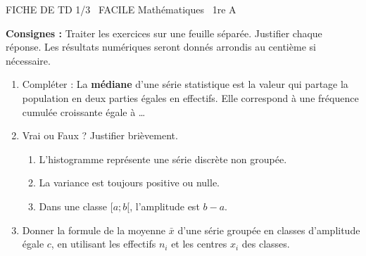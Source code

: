 \documentclass[11pt]{article}
\begin{document}
\begin{tcolorbox}[enhanced,colback=popink,colframe=popink,arc=10pt,boxrule=0pt,left=12pt,right=12pt,top=9pt,bottom=9pt]
{\color{white}\popxbold\small FICHE DE TD 1/3 \textbullet\ FACILE \hfill Mathématiques \textbullet\ 1re A\par}
\end{tcolorbox}
\vspace{4pt}
\noindent \textbf{Consignes :} Traiter les exercices sur une feuille séparée. Justifier chaque réponse. Les résultats numériques seront donnés arrondis au centième si nécessaire.

\begin{exercice}
\begin{enumerate}
    \item Compléter : La \textbf{médiane} d'une série statistique est la valeur qui partage la population en deux parties égales en effectifs. Elle correspond à une fréquence cumulée croissante égale à \ldots
    \item Vrai ou Faux ? Justifier brièvement.
    \begin{enumerate}
        \item L'histogramme représente une série discrète non groupée.
        \item La variance est toujours positive ou nulle.
        \item Dans une classe $[a; b[$, l'amplitude est $b-a$.
    \end{enumerate}
    \item Donner la formule de la moyenne $\bar{x}$ d'une série groupée en classes d'amplitude égale $c$, en utilisant les effectifs $n_i$ et les centres $x_i$ des classes.
\end{enumerate}
\end{exercice}
\end{document}
